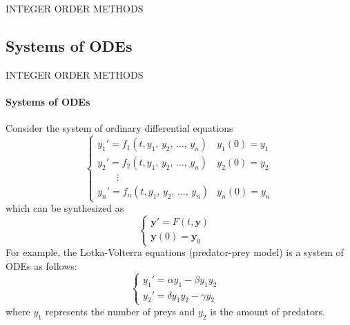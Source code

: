 \begin{frame}{INTEGER ORDER METHODS}
\begin{multicols}{2}
\begin{figure}[H]
    
    \end{figure}
\end{multicols}
\end{frame}

\subsection{Systems of ODEs}
\begin{frame}{INTEGER ORDER METHODS}
    \framesubtitle{Systems of ODEs}
    Consider the system of ordinary differential equations
    \begin{equation}
        \begin{cases}
            y_1'=f_1(t,y_1,\,y_2,\,\dots,\,y_n)&y_1(0)=y_{1}\\ y_2'=f_2(t,y_1,\,y_2,\,\dots,\,y_n)&y_2(0)=y_{2}\\
            \qquad\vdots&\\
            y_n'=f_n(t,y_1,\,y_2,\,\dots,\,y_n)&y_n(0)=y_{n}
        \end{cases}
    \end{equation}
    which can be synthesized as 
    \begin{equation}
        \begin{cases}
            \mathbf{y}'=F(t,\mathbf{y})&\\
            \mathbf{y}(0)=\mathbf{y}_0
        \end{cases}
    \end{equation}
    For example, the Lotka-Volterra equations (predator-prey model) is a system of ODEs as follows:
\begin{equation}
    \begin{cases}{y_1'=\alpha y_1-\beta y_1 y_2}& \\ {y_2'=\delta y_1 y_2-\gamma y_2}&\end{cases}
\end{equation}
where $y_1$ represents the number of preys and $y_2$ is the amount of predators.

\end{frame}

